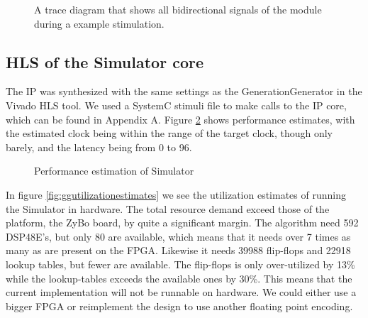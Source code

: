 \begin{figure}[h!]
	\centering
	\caption{A trace diagram that shows all bidirectional signals of the module during a example stimulation.}
	\label{fig:generationgeneratortrace}
\end{figure}
\FloatBarrier

\subsection{HLS of the Simulator core}

The IP was synthesized with the same settings as the GenerationGenerator in the Vivado HLS tool. We used a SystemC stimuli file to make calls to the IP core, which can be found in Appendix A. Figure \ref{fig:simperformanceestimates} shows performance estimates, with the estimated clock being within the range of the target clock, though only barely, and the latency being from  0 to 96. 

\begin{figure}[h!]
	\centering
	\caption{Performance estimation of Simulator}
	\label{fig:simperformanceestimates}
\end{figure}
\FloatBarrier
In figure \ref{fig:ggutilizationestimates} we see the utilization estimates of running the Simulator in hardware. The total resource demand exceed those of the platform, the ZyBo board, by quite a significant margin. The algorithm need 592 DSP48E's, but only 80 are available, which means that it needs over 7 times as many as are present on the FPGA. Likewise it needs 39988 flip-flops and 22918 lookup tables, but fewer are available. The flip-flops is only over-utilized by 13\% while the lookup-tables exceeds the available ones by 30\%. This means that the current implementation will not be runnable on hardware. We could either use a bigger FPGA or reimplement the design to use another floating point encoding.

